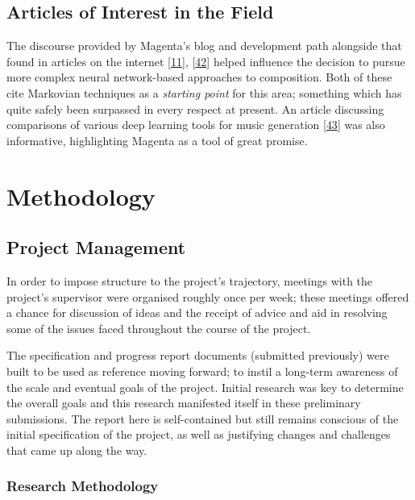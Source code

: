 \documentclass[12pt,]{article}
\begin{document}
\hypertarget{articles-of-interest-in-the-field}{%
\subsection{Articles of Interest in the
Field}\label{articles-of-interest-in-the-field}}

The discourse provided by Magenta's blog and development path alongside
that found in articles on the internet
{[}\protect\hyperlink{ref-mediumkylemcdonald}{11}{]},
{[}\protect\hyperlink{ref-mkofler}{42}{]} helped influence the decision
to pursue more complex neural network-based approaches to composition.
Both of these cite Markovian techniques as a \emph{starting point} for
this area; something which has quite safely been surpassed in every
respect at present. An article discussing comparisons of various deep
learning tools for music generation
{[}\protect\hyperlink{ref-asimovinst}{43}{]} was also informative,
highlighting Magenta as a tool of great promise.

\hypertarget{methodology}{%
\section{Methodology}\label{methodology}}

\hypertarget{project-management}{%
\subsection{Project Management}\label{project-management}}

In order to impose structure to the project's trajectory, meetings with
the project's supervisor were organised roughly once per week; these
meetings offered a chance for discussion of ideas and the receipt of
advice and aid in resolving some of the issues faced throughout the
course of the project.

The specification and progress report documents (submitted previously)
were built to be used as reference moving forward; to instil a long-term
awareness of the scale and eventual goals of the project. Initial
research was key to determine the overall goals and this research
manifested itself in these preliminary submissions. The report here is
self-contained but still remains conscious of the initial specification
of the project, as well as justifying changes and challenges that came
up along the way.

\hypertarget{research-methodology}{%
\subsubsection{Research Methodology}\label{research-methodology}}
\end{document}
